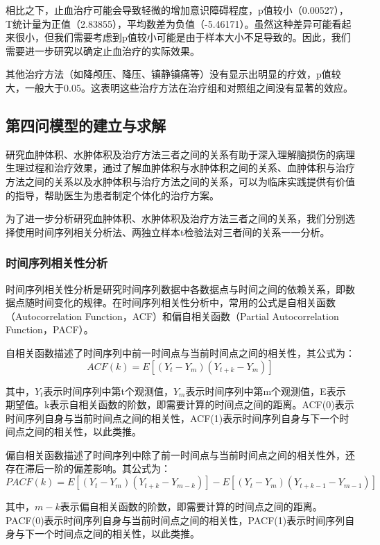 \documentclass[bwprint]{gmcmthesis}
\begin{document}
相比之下，止血治疗可能会导致轻微的增加意识障碍程度，p值较小（0.00527），T统计量为正值（2.83855），平均数差为负值（-5.46171）。虽然这种差异可能看起来很小，但我们需要考虑到p值较小可能是由于样本大小不足导致的。因此，我们需要进一步研究以确定止血治疗的实际效果。

其他治疗方法（如降颅压、降压、镇静镇痛等）没有显示出明显的疗效，p值较大，一般大于0.05。这表明这些治疗方法在治疗组和对照组之间没有显著的效应。

\subsection{第四问模型的建立与求解}
研究血肿体积、水肿体积及治疗方法三者之间的关系有助于深入理解脑损伤的病理生理过程和治疗效果，通过了解血肿体积与水肿体积之间的关系、血肿体积与治疗方法之间的关系以及水肿体积与治疗方法之间的关系，可以为临床实践提供有价值的指导，帮助医生为患者制定个体化的治疗方案。

为了进一步分析研究血肿体积、水肿体积及治疗方法三者之间的关系，我们分别选择使用时间序列相关分析法、两独立样本t检验法对三者间的关系一一分析。

\subsubsection{时间序列相关性分析}
时间序列相关性分析是研究时间序列数据中各数据点与时间之间的依赖关系，即数据点随时间变化的规律\cite{丁明2005基于时间序列分析的风电场风速预测模型}。在时间序列相关性分析中，常用的公式是自相关函数（Autocorrelation Function，ACF）和偏自相关函数（Partial Autocorrelation Function，PACF）\cite{liu2012comparison}。

自相关函数描述了时间序列中前一时间点与当前时间点之间的相关性，其公式为：
\begin{equation}
ACF(k) = E[(Y_t - Y_m)(Y_{t+k} - Y_m)]
\end{equation}

其中，$Y_t$表示时间序列中第t个观测值，$Y_m$表示时间序列中第m个观测值，E表示期望值。k表示自相关函数的阶数，即需要计算的时间点之间的距离。ACF(0)表示时间序列自身与当前时间点之间的相关性，ACF(1)表示时间序列自身与下一个时间点之间的相关性，以此类推。

偏自相关函数描述了时间序列中除了前一时间点与当前时间点之间的相关性外，还存在滞后一阶的偏差影响。其公式为：
\begin{equation}
PACF(k) = E[(Y_t - Y_m)(Y_{t+k} - Y_{m-k})] - E[(Y_t - Y_m)(Y_{t+k-1} - Y_{m-1})]
\end{equation}

其中，$m-k$表示偏自相关函数的阶数，即需要计算的时间点之间的距离。PACF(0)表示时间序列自身与当前时间点之间的相关性，PACF(1)表示时间序列自身与下一个时间点之间的相关性，以此类推。
\end{document}
